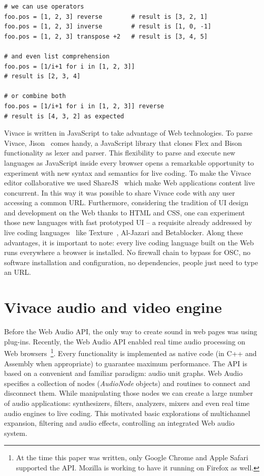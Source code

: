 \documentclass[letterpaper, 12pt]{article}
\begin{document}
{\begin{Verbatim}[fontfamily=courier, xleftmargin=\parindent]
# we can use operators
foo.pos = [1, 2, 3] reverse        # result is [3, 2, 1]
foo.pos = [1, 2, 3] inverse        # result is [1, 0, -1]
foo.pos = [1, 2, 3] transpose +2   # result is [3, 4, 5]

# and even list comprehension
foo.pos = [1/i+1 for i in [1, 2, 3]] 
# result is [2, 3, 4]

# or combine both
foo.pos = [1/i+1 for i in [1, 2, 3]] reverse 
# result is [4, 3, 2] as expected
\end{Verbatim}

Vivace is written in JavaScript to take advantage of Web technologies.
To parse Vivace, Jison~\citep{jison} comes handy, a JavaScript
library that clones Flex and Bison functionality as lexer and
parser. This flexibility to parse and execute new languages as
JavaScript inside every browser opens a remarkable opportunity to
experiment with new syntax and semantics for live coding. To make the
Vivace editor collaborative we used ShareJS~\citep{sharejs} which make
Web applications content live concurrent. In this way it was possible
to share Vivace code with any user accessing a common
URL. Furthermore, considering the tradition of UI design and
development on the Web thanks to HTML and CSS, one can experiment
those new languages with fast prototyped UI -- a requisite already
addressed by live coding languages~\citep{mclean2010visualisation,
  magnusson2011algorithms} like Texture~\citep{mclean2011texture},
Al-Jazari and Betablocker. Along these advantages, it is important to
note: every live coding language built on the Web runs everywhere a
browser is installed. No firewall chain to bypass for OSC, no software
installation and configuration, no dependencies, people just need to
type an URL.

\section{Vivace audio and video engine}

Before the Web Audio API, the only way to create sound in web pages
was using plug-ins. Recently, the Web Audio API enabled real time
audio processing on Web browsers~\footnote{At the time this paper was
  written, only Google Chrome and Apple Safari supported the
  API. Mozilla is working to have it running on Firefox as
  well.}. Every functionality is implemented as native code (in C++
and Assembly when appropriate) to guarantee maximum performance. The
API is based on a convenient and familiar paradigm: audio unit
graphs. Web Audio specifies a collection of nodes (\emph{AudioNode}
objects) and routines to connect and disconnect them. While
manipulating those nodes we can create a large number of audio
applications: synthesizers, filters, analyzers, mixers and even real
time audio engines to live coding. This motivated basic explorations
of multichannel expansion, filtering and audio effects, controlling an
integrated Web audio system.

}
\end{document}
